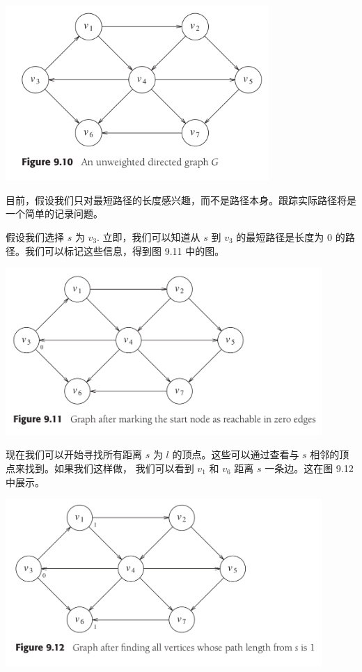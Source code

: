 \documentclass[a4paper]{ctexart}
\theoremstyle{definition}
\theoremstyle{definition}
\begin{document}
\begin{center}
  \includegraphics[width=0.75\textwidth]{images/FIG9_10.png}
\end{center}

目前，假设我们只对最短路径的长度感兴趣，而不是路径本身。跟踪实际路径将是一个简单的记录问题。

假设我们选择 \(s\) 为 \(v_3\). 立即，我们可以知道从 \(s\) 到 \(v_3\) 的最短路径是长度为 $0$ 的路径。我们可以标记这些信息，得到图 9.11 中的图。

\begin{center}
  \includegraphics[width=0.9\textwidth]{images/FIG9_11.png}
\end{center}

现在我们可以开始寻找所有距离 \(s\) 为 \(l\) 的顶点。这些可以通过查看与 \(s\) 相邻的顶点来找到。如果我们这样做，
我们可以看到 \(v_1\) 和 \(v_6\) 距离 \(s\) 一条边。这在图 9.12 中展示。

\begin{center}
  \includegraphics[width=0.9\textwidth]{images/FIG9_12.png}
\end{center}
\end{document}
